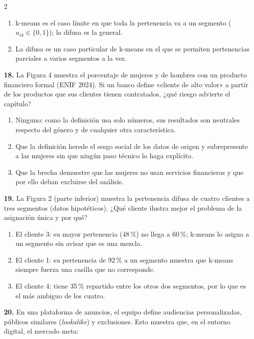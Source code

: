 \documentclass[10pt,letterpaper]{article}
\begin{document}
\begin{multicols}{2}
\begin{enumerate}[label=\alph*),leftmargin=1.1em,itemsep=0pt,topsep=1pt,parsep=0pt,partopsep=0pt]
\item k-means es el caso límite en que toda la pertenencia va a un segmento ($u_{ik}\in\{0,1\}$); la difusa es la general.
\item La difusa es un caso particular de k-means en el que se permiten pertenencias parciales a varios segmentos a la vez.
\end{enumerate}
\vspace{2pt}
\noindent\textbf{18.} La Figura 4 muestra el porcentaje de mujeres y de hombres con un producto financiero formal (ENIF 2024). Si un banco define «cliente de alto valor» a partir de los productos que sus clientes tienen contratados, ¿qué riesgo advierte el capítulo?
\vspace{-3pt}
\begin{enumerate}[label=\alph*),leftmargin=1.1em,itemsep=0pt,topsep=1pt,parsep=0pt,partopsep=0pt]
\item Ninguno: como la definición usa solo números, sus resultados son neutrales respecto del género y de cualquier otra característica.
\item Que la definición herede el sesgo social de los datos de origen y subrepresente a las mujeres sin que ningún paso técnico lo haga explícito.
\item Que la brecha demuestre que las mujeres no usan servicios financieros y que por ello deban excluirse del análisis.
\end{enumerate}
\vspace{2pt}
\noindent\textbf{19.} La Figura 2 (parte inferior) muestra la pertenencia difusa de cuatro clientes a tres segmentos (datos hipotéticos). ¿Qué cliente ilustra mejor el problema de la asignación única y por qué?
\vspace{-3pt}
\begin{enumerate}[label=\alph*),leftmargin=1.1em,itemsep=0pt,topsep=1pt,parsep=0pt,partopsep=0pt]
\item El cliente 3: su mayor pertenencia (48\,\%) no llega a 60\,\%; k-means lo asigna a un segmento sin avisar que es una mezcla.
\item El cliente 1: su pertenencia de 92\,\% a un segmento muestra que k-means siempre fuerza una casilla que no corresponde.
\item El cliente 4: tiene 35\,\% repartido entre los otros dos segmentos, por lo que es el más ambiguo de los cuatro.
\end{enumerate}
\vspace{2pt}
\noindent\textbf{20.} En una plataforma de anuncios, el equipo define audiencias personalizadas, públicos similares (\textit{lookalike}) y exclusiones. Esto muestra que, en el entorno digital, el mercado meta:

\end{multicols}
\end{document}
